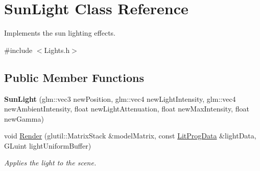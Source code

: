 \hypertarget{class_sun_light}{\section{Sun\-Light Class Reference}
\label{class_sun_light}
}


Implements the sun lighting effects.  




{\ttfamily \#include $<$Lights.\-h$>$}

\subsection*{Public Member Functions}
\begin{DoxyCompactItemize}
\item 
\hypertarget{class_sun_light_af4ae6d33a13803bd6f0e46deac05f72b}{{\bfseries Sun\-Light} (glm\-::vec3 new\-Position, glm\-::vec4 new\-Light\-Intensity, glm\-::vec4 new\-Ambient\-Intensity, float new\-Light\-Attenuation, float new\-Max\-Intensity, float new\-Gamma)}\label{class_sun_light_af4ae6d33a13803bd6f0e46deac05f72b}

\item 
\hypertarget{class_sun_light_ab07e3bc491af9f3aeb177cbebf1825b6}{void \hyperlink{class_sun_light_ab07e3bc491af9f3aeb177cbebf1825b6}{Render} (glutil\-::\-Matrix\-Stack \&model\-Matrix, const \hyperlink{struct_lit_prog_data}{Lit\-Prog\-Data} \&light\-Data, G\-Luint light\-Uniform\-Buffer)}\label{class_sun_light_ab07e3bc491af9f3aeb177cbebf1825b6}

\begin{DoxyCompactList}\small\item\em Applies the light to the scene. \end{DoxyCompactList}\end{DoxyCompactItemize}
